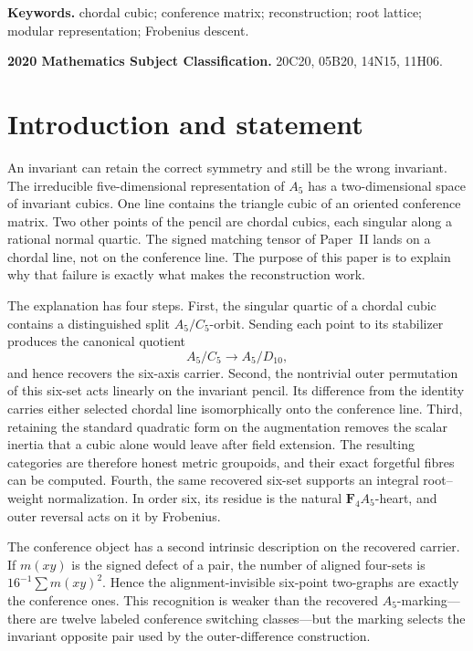\documentclass[11pt]{article}
\theoremstyle{definition}
\theoremstyle{remark}
\newcommand{\F}{\mathbf F}
\begin{document}
\noindent\textbf{Keywords.} chordal cubic; conference matrix; reconstruction;
root lattice; modular representation; Frobenius descent.

\smallskip
\noindent\textbf{2020 Mathematics Subject Classification.} 20C20, 05B20,
14N15, 11H06.

\section{Introduction and statement}
\label{sec:introduction}

An invariant can retain the correct symmetry and still be the wrong
invariant.  The irreducible five-dimensional representation of \(A_5\) has a
two-dimensional space of invariant cubics.  One line contains the triangle
cubic of an oriented conference matrix.  Two other points of the pencil are
chordal cubics, each singular along a rational normal quartic.  The signed
matching tensor of Paper~II lands on a chordal line, not on the conference
line.  The purpose of this paper is to explain why that failure is exactly
what makes the reconstruction work.

The explanation has four steps.  First, the singular quartic of a chordal
cubic contains a distinguished split \(A_5/C_5\)-orbit.  Sending each point
to its stabilizer produces the canonical quotient
\[
              A_5/C_5\longrightarrow A_5/D_{10},
\]
and hence recovers the six-axis carrier.  Second, the nontrivial outer
permutation of this six-set acts linearly on the invariant pencil.  Its
difference from the identity carries either selected chordal line
isomorphically onto the conference line.  Third, retaining the standard
quadratic form on the augmentation removes the scalar inertia that a cubic
alone would leave after field extension.  The resulting categories are
therefore honest metric groupoids, and their exact forgetful fibres can be
computed.  Fourth, the same recovered six-set supports an integral
root--weight normalization.  In order six, its residue is the natural
\(\F_4A_5\)-heart, and outer reversal acts on it by Frobenius.

The conference object has a second intrinsic description on the recovered
carrier.  If \(m(xy)\) is the signed defect of a pair, the number of aligned
four-sets is \(16^{-1}\sum m(xy)^2\).  Hence the alignment-invisible
six-point two-graphs are exactly the conference ones.  This recognition is
weaker than the recovered \(A_5\)-marking---there are twelve labeled
conference switching classes---but the marking selects the invariant opposite
pair used by the outer-difference construction.
\end{document}
